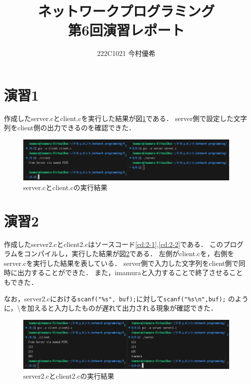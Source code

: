 \documentclass[documentclass]{jsarticle}
\begin{document}
\title{ネットワークプログラミング\\ 第6回演習レポート}
\author{222C1021 今村優希}
\maketitle

\newpage

\section*{演習1}
作成したserver.cとclient.cを実行した結果が図\ref*{fig:1-1}である．
server側で設定した文字列をclient側の出力できるのを確認できた．

\begin{figure}[H]
  \begin{center}
    \includegraphics*[scale=0.7]{figure/1-1.png}
  \end{center}
  \caption{server.cとclient.cの実行結果}
  \label{fig:1-1}
\end{figure}

\newpage
\section*{演習2}
作成したserver2.cとclient2.cはソースコード\ref*{cd:2-1},\ref*{cd:2-2}である．
このプログラムをコンパイルし，実行した結果が図\ref*{fig:2-1}である．
左側がclient.cを，右側をserver.cを実行した結果を表している．
server側で入力した文字列をclient側で同時に出力することができた．
また，imamuraと入力することで終了させることもできた．

なお，server2.cにおける\texttt{scanf("\%s", buf);}に対して\texttt{scanf("\%s\textbackslash n",buf);}
のように，\textbackslash を加えると入力したものが遅れて出力される現象が確認できた．




\begin{figure}[H]
  \begin{center}
    \includegraphics*[scale=0.7]{figure/2-1.png}
  \end{center}
  \caption{server2.cとclient2.cの実行結果}
  \label{fig:2-1}
\end{figure}
\end{document}
